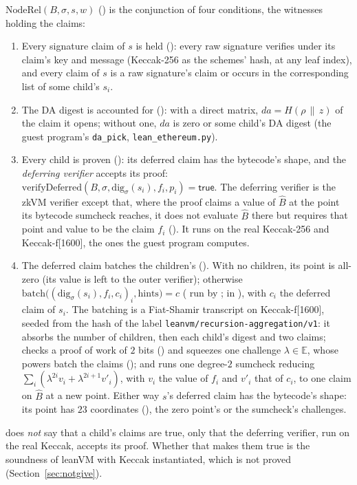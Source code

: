 \documentclass[11pt]{article}
\begin{document}
$\mathrm{NodeRel}(B, \sigma, s, w)$ () is the conjunction of four conditions,
the witnesses holding the claims:
\begin{enumerate}
\item Every signature claim of $s$ is held (): every raw signature verifies
under its claim's key and message (Keccak-256 as the schemes' hash, at any leaf index), and every
claim of $s$ is a raw signature's claim or occurs in the corresponding list of some child's $s_i$.
\item The DA digest is accounted for (): with a direct matrix,
$\mathit{da} = H(\rho \,\|\, z)$ of the claim it opens; without one, $\mathit{da}$ is zero or
some child's DA digest (the guest program's \texttt{da\_pick}, \texttt{lean\_ethereum.py}).
\item Every child is proven (): its deferred claim has the bytecode's shape,
and the \emph{deferring verifier} accepts its proof: $\mathrm{verifyDeferred}(B, \sigma,
\mathrm{dig}_\sigma(s_i), f_i, p_i) = \mathsf{true}$. The deferring verifier is the zkVM verifier
except that, where the proof claims a value of $\widehat{B}$ at the point its bytecode sumcheck
reaches, it does not evaluate $\widehat{B}$ there but requires that point and value to be the claim
$f_i$ (). It runs on the real Keccak-256 and Keccak-f[1600], the ones the guest program
computes.
\item The deferred claim batches the children's (). With no children, its
point is all-zero (its value is left to the outer verifier); otherwise $\mathrm{batch}\big(
(\mathrm{dig}_\sigma(s_i), f_i, c_i)_i, \text{hints}\big) = c$ ( run by
;  in ), with $c_i$ the deferred claim of $s_i$. The
batching is a Fiat-Shamir transcript on Keccak-f[1600], seeded from the hash of the label
\texttt{leanvm/recursion-aggregation/v1}: it absorbs the number of children, then each child's
digest and two claims; checks a proof of work of $2$ bits () and squeezes one challenge $\lambda \in \mathbb{E}$, whose powers batch the
claims (); and runs one degree-$2$ sumcheck reducing
$\sum_i (\lambda^{2i} v_i + \lambda^{2i+1} v'_i)$, with $v_i$
the value of $f_i$ and $v'_i$ that of $c_i$, to one claim on $\widehat{B}$ at a new point.
Either way $s$'s deferred claim has the bytecode's shape: its point has $23$ coordinates
(), the zero point's or the sumcheck's challenges.
\end{enumerate}
 does \emph{not} say that a child's claims are true, only that the deferring verifier,
run on the real Keccak, accepts its proof. Whether that makes them true is the soundness of leanVM
with Keccak instantiated, which is not proved (Section~\ref{sec:notgive}).
\end{document}
